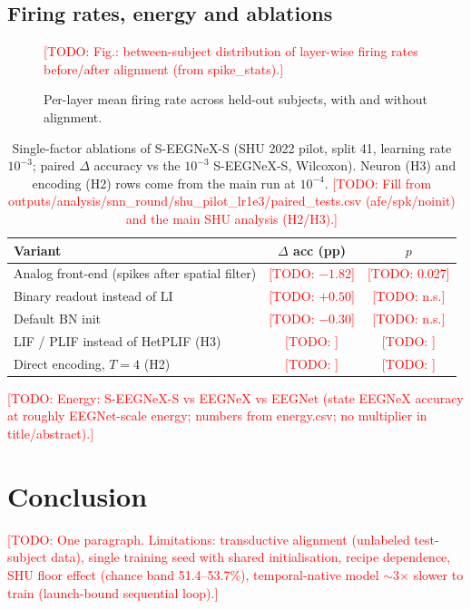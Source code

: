 \documentclass{article}
\newcommand{\todo}[1]{\textcolor{red}{[TODO: #1]}}
\begin{document}
\subsection{Firing rates, energy and ablations}
\label{ssec:ablation}
\begin{figure}[t]
  \centering
  \todo{Fig.: between-subject distribution of layer-wise firing rates before/after alignment (from spike\_stats).}
  \caption{Per-layer mean firing rate across held-out subjects, with and without alignment.}
  \label{fig:rates}
\end{figure}
\begin{table}[t]
  \centering
  \caption{Single-factor ablations of S-EEGNeX-S (SHU 2022 pilot, split 41, learning rate $10^{-3}$; paired $\Delta$ accuracy vs the $10^{-3}$ S-EEGNeX-S, Wilcoxon). Neuron (H3) and encoding (H2) rows come from the main run at $10^{-4}$. \todo{Fill from outputs/analysis/snn\_round/shu\_pilot\_lr1e3/paired\_tests.csv (afe/spk/noinit) and the main SHU analysis (H2/H3).}}
  \label{tab:ablation}
  \small
  \begin{tabular}{lcc}
    \toprule
    Variant & $\Delta$ acc (pp) & $p$ \\
    \midrule
    Analog front-end (spikes after spatial filter) & \todo{$-1.82$} & \todo{0.027} \\
    Binary readout instead of LI & \todo{$+0.50$} & \todo{n.s.} \\
    Default BN init & \todo{$-0.30$} & \todo{n.s.} \\
    LIF / PLIF instead of HetPLIF (H3) & \todo{} & \todo{} \\
    Direct encoding, $T{=}4$ (H2) & \todo{} & \todo{} \\
    \bottomrule
  \end{tabular}
\end{table}
\todo{Energy: S-EEGNeX-S vs EEGNeX vs EEGNet (state EEGNeX accuracy at roughly EEGNet-scale energy; numbers from energy.csv; no multiplier in title/abstract).}

\section{Conclusion}
\label{sec:conclusion}
\todo{One paragraph. Limitations: transductive alignment (unlabeled test-subject data), single training seed with shared initialisation, recipe dependence, SHU floor effect (chance band 51.4--53.7\%), temporal-native model $\sim$3$\times$ slower to train (launch-bound sequential loop).}




\end{document}
